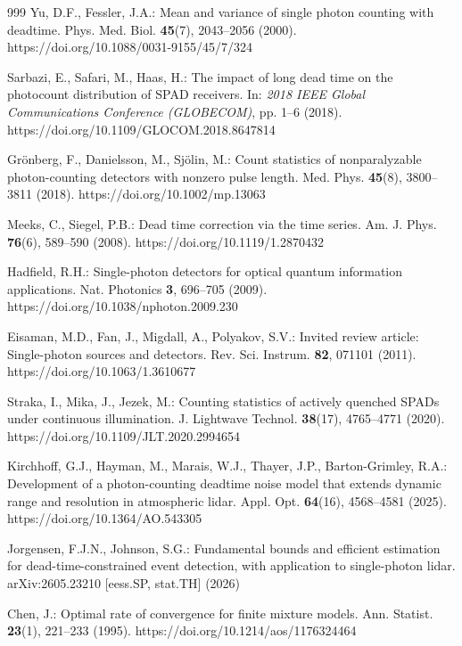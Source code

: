 \begin{thebibliography}{999}
Yu, D.F., Fessler, J.A.: Mean and variance of single photon counting with deadtime. Phys. Med. Biol. \textbf{45}(7), 2043--2056 (2000). https://doi.org/10.1088/0031-9155/45/7/324

Sarbazi, E., Safari, M., Haas, H.: The impact of long dead time on the
photocount distribution of SPAD receivers. In: \emph{2018 IEEE Global
Communications Conference (GLOBECOM)}, pp. 1--6 (2018).
https://doi.org/10.1109/GLOCOM.2018.8647814

Gr\"onberg, F., Danielsson, M., Sj\"olin, M.: Count statistics of
nonparalyzable photon-counting detectors with nonzero pulse length. Med. Phys.
\textbf{45}(8), 3800--3811 (2018). https://doi.org/10.1002/mp.13063

Meeks, C., Siegel, P.B.: Dead time correction via the time series. Am. J.
Phys. \textbf{76}(6), 589--590 (2008). https://doi.org/10.1119/1.2870432

Hadfield, R.H.: Single-photon detectors for optical quantum information applications. Nat. Photonics \textbf{3}, 696--705 (2009). https://doi.org/10.1038/nphoton.2009.230

Eisaman, M.D., Fan, J., Migdall, A., Polyakov, S.V.: Invited review article: Single-photon sources and detectors. Rev. Sci. Instrum. \textbf{82}, 071101 (2011). https://doi.org/10.1063/1.3610677

Straka, I., Mika, J., Jezek, M.: Counting statistics of actively quenched SPADs under continuous illumination. J. Lightwave Technol. \textbf{38}(17), 4765--4771 (2020). https://doi.org/10.1109/JLT.2020.2994654

Kirchhoff, G.J., Hayman, M., Marais, W.J., Thayer, J.P., Barton-Grimley, R.A.: Development of a photon-counting deadtime noise model that extends dynamic range and resolution in atmospheric lidar. Appl. Opt. \textbf{64}(16), 4568--4581 (2025). https://doi.org/10.1364/AO.543305

Jorgensen, F.J.N., Johnson, S.G.: Fundamental bounds and efficient estimation for dead-time-constrained event detection, with application to single-photon lidar. arXiv:2605.23210 [eess.SP, stat.TH] (2026)

Chen, J.: Optimal rate of convergence for finite mixture models. Ann. Statist.
\textbf{23}(1), 221--233 (1995).
https://doi.org/10.1214/aos/1176324464


\end{thebibliography}
